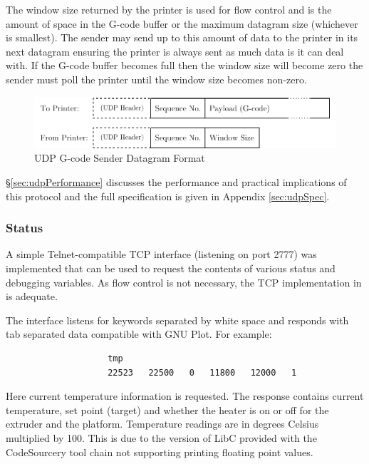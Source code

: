 					The window size returned by the printer is used for flow control and
					is the amount of space in the G-code buffer or the maximum datagram
					size (whichever is smallest). The sender may send up to this amount of
					data to the printer in its next datagram ensuring the printer is
					always sent as much data is it can deal with. If the G-code buffer
					becomes full then the window size will become zero the sender must
					poll the printer until the window size becomes non-zero.
					
					\begin{figure}
						\includegraphics[width=1\textwidth]{diagrams/datagram.pdf}
						\caption{UDP G-code Sender Datagram Format}
						\label{fig:datagram}
					\end{figure}
					
					\S\ref{sec:udpPerformance} discusses the performance and practical
					implications of this protocol and the full specification is given in
					Appendix \ref{sec:udpSpec}.
			
			\subsubsection{Status}
				
				\label{sec:statusInterface}
				
				A simple Telnet-compatible TCP interface (listening on port 2777) was
				implemented that can be used to request the contents of various status
				and debugging variables. As flow control is not necessary, the TCP
				implementation in \uIP{} is adequate.
				
				The interface listens for keywords separated by white space and responds
				with tab separated data compatible with GNU Plot. For example:
				\begin{verbatim}
					tmp
					22523	22500	0	11800	12000	1
				\end{verbatim}
				Here current temperature information is requested. The response contains
				current temperature, set point (target) and whether the heater is on or
				off for the extruder and the platform. Temperature readings are in
				degrees Celsius multiplied by 100. This is due to the version of LibC
				provided with the CodeSourcery tool chain not supporting printing
				floating point values.
				
